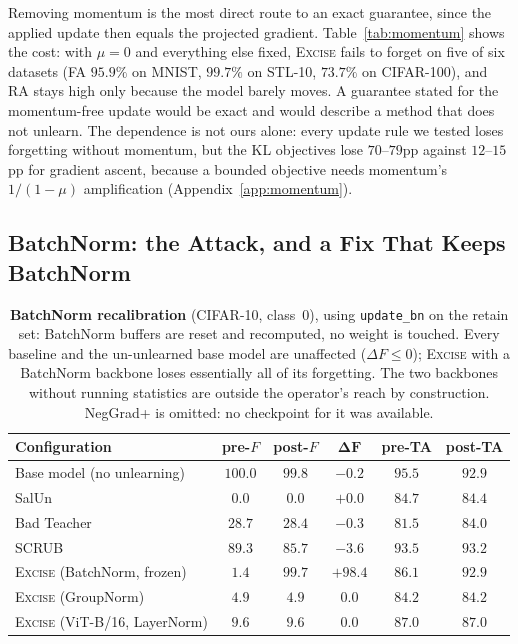 \documentclass{article}
\newcommand{\ours}{\textsc{Excise}}
\theoremstyle{remark}
\theoremstyle{plain}
\begin{document}
Removing momentum is the most direct route to an exact guarantee, since the
applied update then equals the projected gradient. Table~\ref{tab:momentum} shows
the cost: with $\mu = 0$ and everything else fixed, \ours{} fails to forget on
five of six datasets (FA $95.9\%$ on MNIST, $99.7\%$ on STL-10, $73.7\%$ on
CIFAR-100), and RA stays high only because the model barely moves. A guarantee
stated for the momentum-free update would be exact and would describe a method
that does not unlearn. The dependence is not ours alone: every update rule we
tested loses forgetting without momentum, but the KL objectives lose $70$--$79$pp
against $12$--$15$pp for gradient ascent, because a bounded objective needs
momentum's $1/(1-\mu)$ amplification (Appendix~\ref{app:momentum}).

\subsection{BatchNorm: the Attack, and a Fix That Keeps BatchNorm}\label{sec:bn_results}

\begin{table}[t]
\centering
\caption{\textbf{BatchNorm recalibration} (CIFAR-10, class~0), using
\texttt{update\_bn} on the retain set: BatchNorm buffers are reset and
recomputed, no weight is touched. Every baseline and the un-unlearned base model
are unaffected ($\Delta F \le 0$); \ours{} with a BatchNorm backbone loses
essentially all of its forgetting. The two backbones without running statistics
are outside the operator's reach by construction. NegGrad+ is omitted: no
checkpoint for it was available.}
\label{tab:bnrecal}
\begin{tabular}{@{}lccccc@{}}
\toprule
Configuration & pre-$F$ & post-$F$ & $\boldsymbol{\Delta F}$ & pre-TA & post-TA \\
\midrule
Base model (no unlearning)  & $100.0$ & $99.8$ & $-0.2$ & $95.5$ & $92.9$ \\
SalUn                       & $0.0$   & $0.0$  & $+0.0$ & $84.7$ & $84.4$ \\
Bad Teacher                 & $28.7$  & $28.4$ & $-0.3$ & $81.5$ & $84.0$ \\
SCRUB                       & $89.3$  & $85.7$ & $-3.6$ & $93.5$ & $93.2$ \\
\midrule
\ours{} (BatchNorm, frozen) & $1.4$   & $99.7$ & $\mathbf{+98.4}$ & $86.1$ & $92.9$ \\
\ours{} (GroupNorm)         & $4.9$   & $4.9$  & $\mathbf{0.0}$   & $84.2$ & $84.2$ \\
\ours{} (ViT-B/16, LayerNorm) & $9.6$ & $9.6$  & $\mathbf{0.0}$   & $87.0$ & $87.0$ \\
\bottomrule
\end{tabular}
\end{table}
\end{document}
